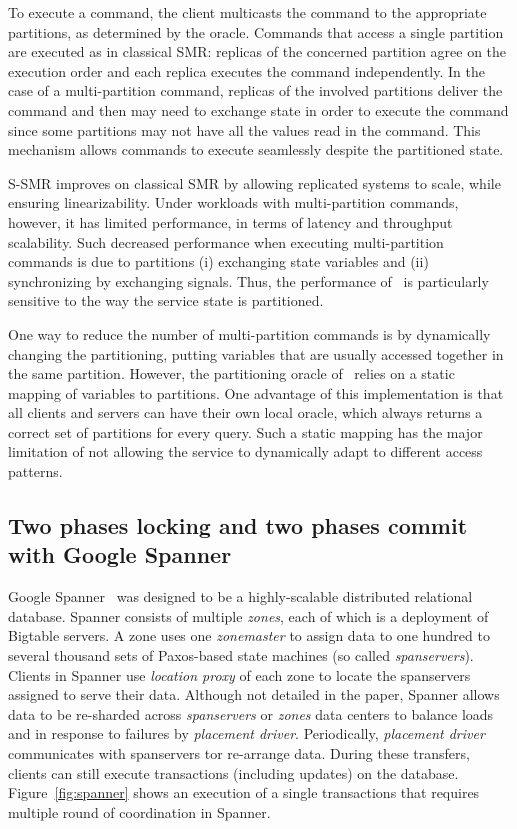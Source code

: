 To execute a command, the client multicasts the command to the appropriate
partitions, as determined by the oracle. Commands that access a single partition
are executed as in classical SMR: replicas of the concerned partition agree on
the execution order and each replica executes the command independently. In the
case of a multi-partition command, replicas of the involved partitions deliver
the command and then may need to exchange state in order to execute the command
since some partitions may not have all the values read in the command. This
mechanism allows commands to execute seamlessly despite the partitioned state.

S-SMR improves on classical SMR by allowing replicated systems to scale, while
ensuring linearizability. Under workloads with multi-partition commands,
however, it has limited performance, in terms of latency and throughput
scalability. Such decreased performance when executing multi-partition commands
is due to partitions (i) exchanging state variables and (ii) synchronizing by
exchanging signals. Thus, the performance of \ssmr\ is particularly
sensitive to the way the service state is partitioned.

One way to reduce the number of multi-partition commands is by dynamically
changing the partitioning, putting variables that are usually accessed together
in the same partition. However, the partitioning oracle of \ssmr\ relies on a
static mapping of variables to partitions. One advantage of this implementation
is that all clients and servers can have their own local oracle, which always
returns a correct set of partitions for every query. Such a static mapping has
the major limitation of not allowing the service to dynamically adapt to
different access patterns.

\subsection{Two phases locking and two phases commit with Google Spanner}

Google Spanner~\cite{corbett2013spanner} was designed to be a highly-scalable
distributed relational database. Spanner consists of multiple \emph{zones}, each
of which is a deployment of Bigtable servers. A zone uses one \emph{zonemaster}
to assign data to one hundred to several thousand sets of Paxos-based state
machines (so called \emph{spanservers}). Clients in Spanner use \emph{location
proxy} of each zone to locate the spanservers assigned to serve their data.
Although not detailed in the paper, Spanner allows data to be re-sharded across
\emph{spanservers} or \emph{zones} data centers to balance loads and in response
to failures by \emph{placement driver}. Periodically, \emph{placement driver}
communicates with spanservers tor re-arrange data. During these transfers,
clients can still execute transactions (including updates) on the database.
Figure~\ref{fig:spanner} shows an execution of a single transactions that
requires multiple round of coordination in Spanner.

